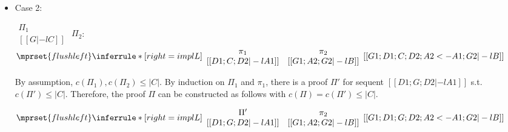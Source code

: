 \begin{itemize}
\item Case 2:
      \begin{center}
        \scriptsize
        \begin{math}
          \begin{array}{c}
            \Pi_1 \\
            {[[G |-l C]]}
          \end{array}
        \end{math}
        \qquad\qquad
        $\Pi_2$:
        \begin{math}
          $$\mprset{flushleft}
          \inferrule* [right={\tiny implL}] {
            {
              \begin{array}{cc}
                \pi_1 & \pi_2 \\
                {[[D1; C; D2 |-l A1]]} & {[[G1; A2; G2 |-l B]]}
              \end{array}
            }
          }{[[G1; D1; C; D2; A2 <- A1; G2 |-l B]]}
        \end{math}
      \end{center}
      By assumption, $c(\Pi_1),c(\Pi_2)\leq |C|$. By induction on $\Pi_1$
      and $\pi_1$, there is a proof $\Pi'$ for sequent
      $[[D1; G; D2 |-l A1]]$ s.t. $c(\Pi') \leq |C|$. Therefore, the proof
      $\Pi$ can be constructed as follows with $c(\Pi) = c(\Pi') \leq |C|$.
      \begin{center}
        \scriptsize
        \begin{math}
          $$\mprset{flushleft}
          \inferrule* [right={\tiny implL}] {
            {
              \begin{array}{cc}
                \Pi' & \pi_2 \\
                {[[D1; G; D2 |-l A1]]} & {[[G1; A2; G2 |-l B]]}
              \end{array}
            }
          }{[[G1; D1; G; D2; A2 <- A1; G2 |-l B]]}
        \end{math}
      \end{center}


\end{itemize}
